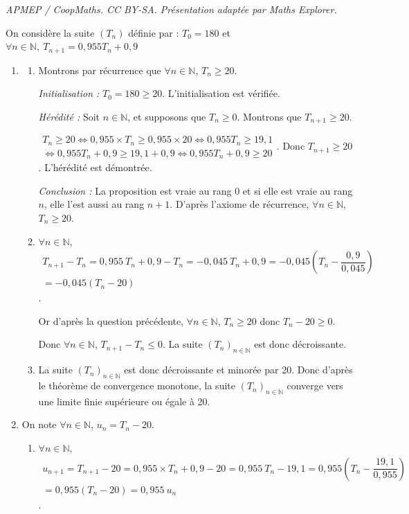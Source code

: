 \documentclass[10pt]{article}
\providecommand{\N}{\mathbb{N}}
\begin{document}
\noindent\textit{APMEP / CoopMaths. CC BY-SA. Présentation adaptée par Maths Explorer.}\par\medskip
\bigskip

On considère la suite $\left(T_n\right)$ définie par : $T_0 = 180$ et $\forall n \in \N,~T_{n+1} = 0,955T_n + 0,9$

\begin{enumerate}
	\item 
	\begin{enumerate}
		\item Montrons par récurrence que $\forall n \in \N$, $T_n \geqslant20$.

		\textit{Initialisation :} $T_0=180\geqslant 20$. L'initialisation est vérifiée.

		\textit{Hérédité :} Soit  $n \in \N$, et supposons que $T_n \geqslant 0$. Montrons que $T_{n+1}\geqslant 20$.

$\begin{gathered}T_n \geqslant 20 \iff 0,955 \times T_n\geqslant 0,955\times 20\iff 0,955 T_n\geqslant 19,1 \\
		\iff 0,955 T_n + 0,9 \geqslant 19,1+0,9 \iff 0,955 T_n + 0,9 \geqslant 20\end{gathered}$. Donc $T_{n+1}\geqslant 20$. L'hérédité est démontrée.

\textit{Conclusion : }  La proposition est vraie au rang $0$ et si elle est vraie au rang $n$, elle l'est aussi au rang $n + 1$.	D'après l'axiome de récurrence, $\forall n \in \N$, $T_n\geqslant 20$.
		\item $\forall n \in \N$, $\begin{gathered}T_{n+1}- T_n= 0,955~T_n+ 0,9 - T_n = - 0,045~T_n+0,9=-0,045\left(T_n-\dfrac{0,9}{0,045}\right)\\
	=-0,045(T_n-20)\end{gathered}$.

Or d'après la question précédente, $\forall n \in \N$, $T_n\geqslant 20$ donc $T_n - 20 \geqslant 0$.

Donc $\forall n \in \N$, $T_{n+1}-T_n \leqslant0$. La suite $(T_n)_{n\in \N}$ est donc décroissante.
		\item La suite $(T_n)_{n\in \N}$ est donc décroissante et minorée par 20. Donc d'après le théorème de convergence monotone, la suite $(T_n)_{n\in \N}$ converge vers une limite finie supérieure ou égale à 20.
	\end{enumerate}
	\item On note $\forall n \in \N$, $u_n=T_n-20$.
	\begin{enumerate}
		\item $\forall n\in \N$, $\begin{gathered}u_{n+1}=T_{n+1}-20=0,955\times T_n+0,9-20=0,955~T_n-19,1=0,955\left(T_n-\dfrac{19,1}{0,955}\right)\\=0,955(T_n-20)=0,955~u_n\end{gathered}$.


\end{enumerate}
\end{enumerate}
\end{document}
